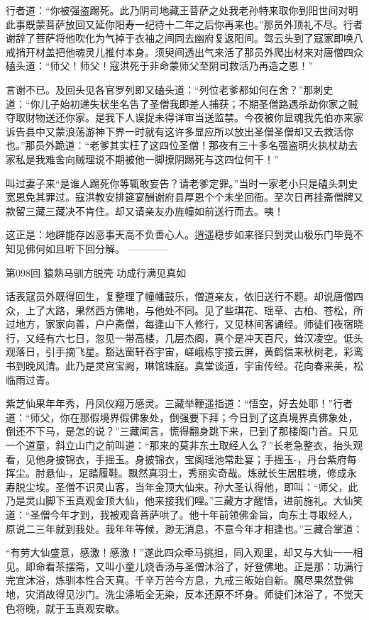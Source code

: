 \documentclass[12pt,UTF8]{ctexbook}
\begin{document}
{	行者道：“你被强盗踢死。此乃阴司地藏王菩萨之处我老孙特来取你到阳世间对明此事既蒙菩萨放回又延你阳寿一纪待十二年之后你再来也。”那员外顶礼不尽。行者谢辞了菩萨将他吹化为气掉于衣袖之间同去幽府复返阳间。驾云头到了寇家即唤八戒捎开材盖把他魂灵儿推付本身。须臾间透出气来活了那员外爬出材来对唐僧四众磕头道：“师父！师父！寇洪死于非命蒙师父至阴司救活乃再造之恩！”
	
	言谢不已。及回头见各官罗列即又磕头道：“列位老爹都如何在舍？”那刺史道：“你儿子始初递失状坐名告了圣僧我即差人捕获；不期圣僧路遇杀劫你家之贼夺取财物送还你家。是我下人误捉未得详审当送监禁。今夜被你显魂我先伯亦来家诉告县中又蒙浪荡游神下界一时就有这许多显应所以放出圣僧圣僧却又去救活你也。”那员外跪道：“老爹其实枉了这四位圣僧！那夜有三十多名强盗明火执杖劫去家私是我难舍向贼理说不期被他一脚撩阴踢死与这四位何干！”
	
	叫过妻子来“是谁人踢死你等辄敢妄告？请老爹定罪。”当时一家老小只是磕头刺史宽恩免其罪过。寇洪教安排筵宴酬谢府县厚恩个个未坐回衙。至次日再挂斋僧牌又款留三藏三藏决不肯住。却又请亲友办旌幢如前送行而去。咦！
	
	这正是：地辟能存凶恶事天高不负善心人。逍遥稳步如来径只到灵山极乐门毕竟不知见佛何如且听下回分解。
	------------
	
	第098回 猿熟马驯方脱壳   功成行满见真如
	
	话表寇员外既得回生，复整理了幢幡鼓乐，僧道亲友，依旧送行不题。却说唐僧四众，上了大路，果然西方佛地，与他处不同。见了些琪花、瑶草、古柏、苍松，所过地方，家家向善，户户斋僧，每逢山下人修行，又见林间客诵经。师徒们夜宿晓行，又经有六七日，忽见一带高楼，几层杰阁，真个是冲天百尺，耸汉凌空。低头观落日，引手摘飞星。豁达窗轩吞宇宙，嵯峨栋宇接云屏，黄鹤信来秋树老，彩鸾书到晚风清。此乃是灵宫宝阙，琳馆珠庭。真堂谈道，宇宙传经。花向春来美，松临雨过青。
	
	紫芝仙果年年秀，丹凤仪翔万感灵。三藏举鞭遥指道：“悟空，好去处耶！”行者道：“师父，你在那假境界假佛象处，倒强要下拜；今日到了这真境界真佛象处，倒还不下马，是怎的说？”三藏闻言，慌得翻身跳下来，已到了那楼阁门首。只见一个道童，斜立山门之前叫道：“那来的莫非东土取经人么？”长老急整衣，抬头观看，见他身披锦衣，手摇玉。身披锦衣，宝阁瑶池常赴宴；手摇玉-，丹台紫府每挥尘。肘悬仙-，足踏履鞋。飘然真羽士，秀丽实奇哉。炼就长生居胜境，修成永寿脱尘埃。圣僧不识灵山客，当年金顶大仙来。孙大圣认得他，即叫：“师父，此乃是灵山脚下玉真观金顶大仙，他来接我们哩。”三藏方才醒悟，进前施礼。大仙笑道：“圣僧今年才到，我被观音菩萨哄了。他十年前领佛金旨，向东土寻取经人，原说二三年就到我处。我年年等候，渺无消息，不意今年才相逢也。”三藏合掌道：
	
	“有劳大仙盛意，感激！感激！”遂此四众牵马挑担，同入观里，却又与大仙一一相见。即命看茶摆斋，又叫小童儿烧香汤与圣僧沐浴了，好登佛地。正是那：功满行完宜沐浴，炼驯本性合天真。千辛万苦今方息，九戒三皈始自新。魔尽果然登佛地，灾消故得见沙门。洗尘涤垢全无染，反本还原不坏身。师徒们沐浴了，不觉天色将晚，就于玉真观安歇。
	
}
\end{document}
